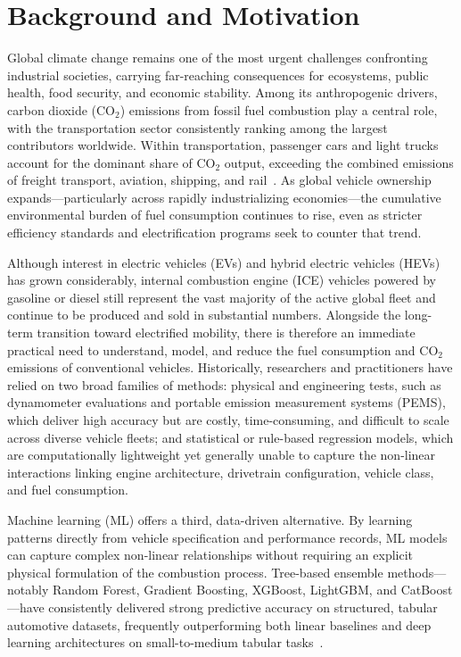 \section{Background and Motivation}

Global climate change remains one of the most urgent challenges confronting industrial societies, carrying far-reaching consequences for ecosystems, public health, food security, and economic stability. Among its anthropogenic drivers, carbon dioxide (CO$_2$) emissions from fossil fuel combustion play a central role, with the transportation sector consistently ranking among the largest contributors worldwide. Within transportation, passenger cars and light trucks account for the dominant share of CO$_2$ output, exceeding the combined emissions of freight transport, aviation, shipping, and rail~\cite{atique2026explainable}. As global vehicle ownership expands---particularly across rapidly industrializing economies---the cumulative environmental burden of fuel consumption continues to rise, even as stricter efficiency standards and electrification programs seek to counter that trend.

Although interest in electric vehicles (EVs) and hybrid electric vehicles (HEVs) has grown considerably, internal combustion engine (ICE) vehicles powered by gasoline or diesel still represent the vast majority of the active global fleet and continue to be produced and sold in substantial numbers. Alongside the long-term transition toward electrified mobility, there is therefore an immediate practical need to understand, model, and reduce the fuel consumption and CO$_2$ emissions of conventional vehicles. Historically, researchers and practitioners have relied on two broad families of methods: physical and engineering tests, such as dynamometer evaluations and portable emission measurement systems (PEMS), which deliver high accuracy but are costly, time-consuming, and difficult to scale across diverse vehicle fleets; and statistical or rule-based regression models, which are computationally lightweight yet generally unable to capture the non-linear interactions linking engine architecture, drivetrain configuration, vehicle class, and fuel consumption.

Machine learning (ML) offers a third, data-driven alternative. By learning patterns directly from vehicle specification and performance records, ML models can capture complex non-linear relationships without requiring an explicit physical formulation of the combustion process. Tree-based ensemble methods---notably Random Forest, Gradient Boosting, XGBoost, LightGBM, and CatBoost---have consistently delivered strong predictive accuracy on structured, tabular automotive datasets, frequently outperforming both linear baselines and deep learning architectures on small-to-medium tabular tasks~\cite{atique2026explainable}.

